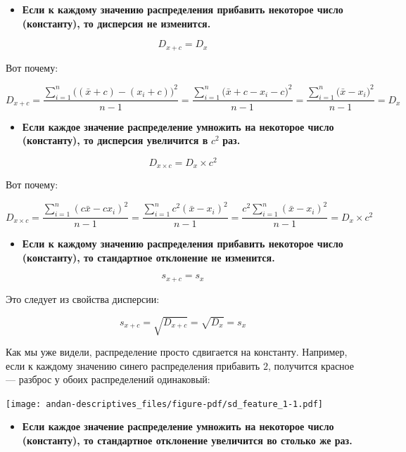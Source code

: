 \documentclass[
  letterpaper,
]{scrbook}
\providecommand{\tightlist}{%
  \setlength{\itemsep}{0pt}\setlength{\parskip}{0pt}}\usepackage{longtable,booktabs,array}
\theoremstyle{definition}
\theoremstyle{remark}
\begin{document}
\begin{itemize}
\tightlist
\item
  \textbf{Если к каждому значению распределения прибавить некоторое
  число (константу), то дисперсия не изменится.}
\end{itemize}

\[
D_{x+c} = D_{x}
\]

Вот почему:

\[
D_{x+c} = \frac{\sum_{i=1}^n \big((\bar x + c) - (x_i + c)\big)^2}{n-1} = \frac{\sum_{i=1}^n \big(\bar x + c - x_i - c\big)^2}{n-1} = \frac{\sum_{i=1}^n \big(\bar x - x_i\big)^2}{n-1} = D_x
\]

\begin{itemize}
\tightlist
\item
  \textbf{Если каждое значение распределение умножить на некоторое число
  (константу), то дисперсия увеличится в} \(c^2\) \textbf{раз.}
\end{itemize}

\[
D_{x \times c} = D_{x} \times c^2
\]

Вот почему:

\[
D_{x \times c} = \frac{\sum_{i=1}^n (c\bar x - cx_i)^2}{n-1} = \frac{\sum_{i=1}^n c^2(\bar x - x_i)^2}{n-1} = \frac{c^2 \sum_{i=1}^n (\bar x - x_i)^2}{n-1} = D_x \times c^2
\]

\begin{itemize}
\tightlist
\item
  \textbf{Если к каждому значению распределения прибавить некоторое
  число (константу), то стандартное отклонение не изменится.}
\end{itemize}

\[
s_{x+c} = s_x
\]

Это следует из свойства дисперсии:

\[
s_{x+c} = \sqrt{D_{x+c}} = \sqrt{D_x} = s_x
\]

Как мы уже видели, распределение просто сдвигается на константу.
Например, если к каждому значению синего распределения прибавить \(2\),
получится красное --- разброс у обоих распределений одинаковый:

\texttt{[image: andan-descriptives\_files/figure-pdf/sd\_feature\_1-1.pdf]}

\begin{itemize}
\tightlist
\item
  \textbf{Если каждое значение распределение умножить на некоторое число
  (константу), то стандартное отклонение увеличится во столько же раз.}
\end{itemize}
\end{document}
